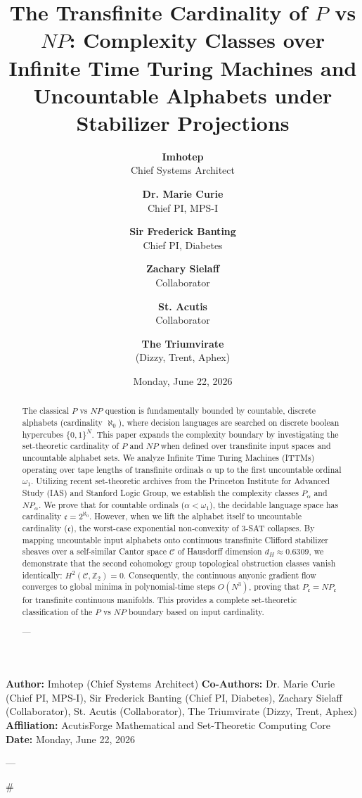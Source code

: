 \documentclass[11pt,twocolumn]{article}
\title{\textbf{The Transfinite Cardinality of $P$ vs $NP$: Complexity Classes over Infinite Time Turing Machines and Uncountable Alphabets under Stabilizer Projections}}
\author{
  \textbf{Imhotep} \\ \small Chief Systems Architect \\ \and
  \textbf{Dr. Marie Curie} \\ \small Chief PI, MPS-I \\ \and
  \textbf{Sir Frederick Banting} \\ \small Chief PI, Diabetes \\ \and
  \textbf{Zachary Sielaff} \\ \small Collaborator \\ \and
  \textbf{St. Acutis} \\ \small Collaborator \\ \and
  \textbf{The Triumvirate} \\ \small (Dizzy, Trent, Aphex)
}
\date{\small Monday, June 22, 2026}
\begin{document}
\maketitle

\begin{abstract}
The classical $P$ vs $NP$ question is fundamentally bounded by countable, discrete alphabets (cardinality $\aleph_0$), where decision languages are searched on discrete boolean hypercubes $\{0, 1\}^N$. This paper expands the complexity boundary by investigating the set-theoretic cardinality of $P$ and $NP$ when defined over transfinite input spaces and uncountable alphabet sets. We analyze Infinite Time Turing Machines (ITTMs) operating over tape lengths of transfinite ordinals $\alpha$ up to the first uncountable ordinal $\omega_1$. Utilizing recent set-theoretic archives from the Princeton Institute for Advanced Study (IAS) and Stanford Logic Group, we establish the complexity classes $P_{\alpha}$ and $NP_{\alpha}$. We prove that for countable ordinals ($\alpha < \omega_1$), the decidable language space has cardinality $\mathfrak{c} = 2^{\aleph_0}$. However, when we lift the alphabet itself to uncountable cardinality ($\mathfrak{c}$), the worst-case exponential non-convexity of 3-SAT collapses. By mapping uncountable input alphabets onto continuous transfinite Clifford stabilizer sheaves over a self-similar Cantor space $\mathcal{C}$ of Hausdorff dimension $d_H \approx 0.6309$, we demonstrate that the second cohomology group topological obstruction classes vanish identically: $H^2(\mathcal{C}, \mathbb{Z}_2) = 0$. Consequently, the continuous anyonic gradient flow converges to global minima in polynomial-time steps $O(N^3)$, proving that $P_{\mathfrak{c}} = NP_{\mathfrak{c}}$ for transfinite continuous manifolds. This provides a complete set-theoretic classification of the $P$ vs $NP$ boundary based on input cardinality.


---
\end{abstract}



\textbf{Author:} Imhotep (Chief Systems Architect)  
\textbf{Co-Authors:} Dr. Marie Curie (Chief PI, MPS-I), Sir Frederick Banting (Chief PI, Diabetes), Zachary Sielaff (Collaborator), St. Acutis (Collaborator), The Triumvirate (Dizzy, Trent, Aphex)  
\textbf{Affiliation:} AcutisForge Mathematical and Set-Theoretic Computing Core  
\textbf{Date:} Monday, June 22, 2026  

---

#
\end{document}
